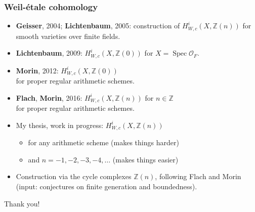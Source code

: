 \documentclass[handout]{beamer}
\newcommand{\personality}[1]{{\bf #1}}
\newcommand{\ZZ}{\mathbb{Z}}
\renewcommand{\O}{\mathcal{O}}
\DeclareMathOperator{\Spec}{Spec}
\begin{document}
\begin{frame}
  \frametitle{Weil-\'etale cohomology}

  \begin{itemize}
  \item<2-> \personality{Geisser}, 2004; \personality{Lichtenbaum}, 2005:
    construction of $H^i_{W,c} (X, \ZZ (n))$ for smooth varieties over finite
    fields.

  \item<3-> \personality{Lichtenbaum}, 2009: $H^i_{W,c} (X, \ZZ (0))$ for
    $X = \Spec \O_F$.

  \item<4-> \personality{Morin}, 2012: $H^i_{W,c} (X, \ZZ (0))$\\
    for proper regular arithmetic schemes.

  \item<5-> \personality{Flach}, \personality{Morin}, 2016:
    $H^i_{W,c} (X, \ZZ (n))$ for $n\in \ZZ$ \\
    for proper regular arithmetic schemes.

  \item<6-> My thesis, work in progress: $H^i_{W,c} (X, \ZZ (n))$

    \begin{itemize}
    \item for any arithmetic scheme (makes things harder)
    \item and $n = -1,-2,-3,-4,\ldots$ (makes things easier)
    \end{itemize}

  \item<7-> Construction via the cycle complexes $\ZZ (n)$, following Flach and
    Morin (input: conjectures on finite generation and boundedness).
  \end{itemize}
\end{frame}


\begin{frame}[plain]
  \headingfont

  \vspace{\fill}

  \begin{center}
    {\huge Thank you!}
  \end{center}

  \vspace{\fill}
\end{frame}
\end{document}
